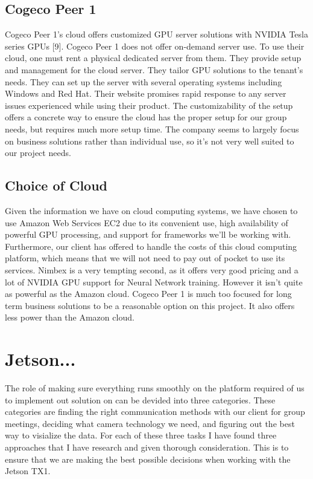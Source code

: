 \documentclass{scrreprt}
\begin{document}
\subsection{Cogeco Peer 1}
Cogeco Peer 1’s cloud offers customized GPU server solutions with NVIDIA Tesla series GPUs
[9]. Cogeco Peer 1 does not offer on-demand server use. To use their cloud, one must rent a
physical dedicated server from them. They provide setup and management for the cloud server.
They tailor GPU solutions to the tenant’s needs. They can set up the server with several
operating systems including Windows and Red Hat. Their website promises rapid response to
any server issues experienced while using their product. The customizability of the setup offers a
concrete way to ensure the cloud has the proper setup for our group needs, but requires much
more setup time. The company seems to largely focus on business solutions rather than
individual use, so it’s not very well suited to our project needs.

\subsection{Choice of Cloud}
Given the information we have on cloud computing systems, we have chosen to use Amazon
Web Services EC2 due to its convenient use, high availability of powerful GPU processing, and
support for frameworks we’ll be working with. Furthermore, our client has offered to handle the
costs of this cloud computing platform, which means that we will not need to pay out of pocket
to use its services. Nimbex is a very tempting second, as it offers very good pricing and a lot of
NVIDIA GPU support for Neural Network training. However it isn’t quite as powerful as the
Amazon cloud. Cogeco Peer 1 is much too focused for long term business solutions to be a
reasonable option on this project. It also offers less power than the Amazon cloud.

\section{Jetson...}

The role of making sure everything runs smoothly on the platform required of us to implement out solution on can be devided into three categories.
These categories are finding the right communication methods with our client for group meetings, deciding what camera technology we need, and figuring out the best way to visialize the data.
For each of these three tasks I have found three approaches that I have research and given thorough consideration.
This is to ensure that we are making the best possible decisions when working with the Jetson TX1.
\end{document}
